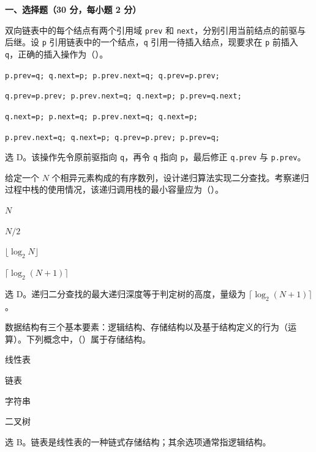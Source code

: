 \textbf{一、选择题（30 分，每小题 2 分）}

\begin{question}
双向链表中的每个结点有两个引用域 \texttt{prev} 和 \texttt{next}，分别引用当前结点的前驱与后继。设 \texttt{p} 引用链表中的一个结点，\texttt{q} 引用一待插入结点，现要求在 \texttt{p} 前插入 \texttt{q}，正确的插入操作为（\quad）。
\begin{choiceoptions}[1]
  \item \texttt{p.prev=q; q.next=p; p.prev.next=q; q.prev=p.prev;}
  \item \texttt{q.prev=p.prev; p.prev.next=q; q.next=p; p.prev=q.next;}
  \item \texttt{q.next=p; p.next=q; p.prev.next=q; q.next=p;}
  \item \texttt{p.prev.next=q; q.next=p; q.prev=p.prev; p.prev=q;}
\end{choiceoptions}
\begin{solution}
选 D。该操作先令原前驱指向 \texttt{q}，再令 \texttt{q} 指向 \texttt{p}，最后修正 \texttt{q.prev} 与 \texttt{p.prev}。
\end{solution}
\end{question}

\begin{question}
给定一个 $N$ 个相异元素构成的有序数列，设计递归算法实现二分查找。考察递归过程中栈的使用情况，该递归调用栈的最小容量应为（\quad）。
\begin{choiceoptions}[2]
  \item $N$
  \item $N/2$
  \item $\lfloor \log_2 N\rfloor$
  \item $\lceil \log_2 (N+1)\rceil$
\end{choiceoptions}
\begin{solution}
选 D。递归二分查找的最大递归深度等于判定树的高度，量级为 $\lceil\log_2(N+1)\rceil$。
\end{solution}
\end{question}

\begin{question}
数据结构有三个基本要素：逻辑结构、存储结构以及基于结构定义的行为（运算）。下列概念中，（\quad）属于存储结构。
\begin{choiceoptions}[2]
  \item 线性表
  \item 链表
  \item 字符串
  \item 二叉树
\end{choiceoptions}
\begin{solution}
选 B。链表是线性表的一种链式存储结构；其余选项通常指逻辑结构。
\end{solution}
\end{question}

